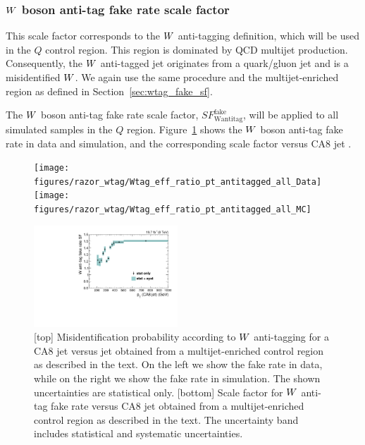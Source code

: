 \subsubsection{\texorpdfstring{$W$}{W} boson anti-tag fake rate scale factor
\label{sec:wantitag_fake_sf}}

This scale factor corresponds to the $W$ anti-tagging definition, which will be used in the $Q$
control region. This region is dominated by QCD multijet production. Consequently, the $W$
anti-tagged jet originates from a quark/gluon jet and is a misidentified $W$. We again use the
same procedure and the multijet-enriched region as defined in Section~\ref{sec:wtag_fake_sf}. 

The $W$ boson anti-tag fake rate scale factor, $SF_\textrm{Wantitag}^\textrm{fake}$, will be
applied to all simulated samples in the $Q$ region. 
Figure~\ref{fig:boost_wantitag} shows the $W$ boson anti-tag fake rate in data and
simulation, and the corresponding scale factor versus CA8 jet \pt.

\begin{figure}[htbp]
\centering
\texttt{[image: figures/razor\_wtag/Wtag\_eff\_ratio\_pt\_antitagged\_all\_Data]}
\texttt{[image: figures/razor\_wtag/Wtag\_eff\_ratio\_pt\_antitagged\_all\_MC]}

\includegraphics[width=0.48\textwidth]{figures/razor_wtag/SF_Wantitagged_Thesis}
\caption{[top] Misidentification probability according to $W$ anti-tagging for a CA8 jet versus jet
\pt obtained from a multijet-enriched control region as described in the text. On the left we show
the fake rate in data, while on the right we show the fake rate in simulation. The shown
uncertainties are statistical only.
[bottom] Scale factor for $W$ anti-tag fake rate versus CA8 jet \pt obtained from a
multijet-enriched control region as described in the text. The uncertainty band includes
statistical and systematic uncertainties.
\label{fig:boost_wantitag}}
\end{figure}



